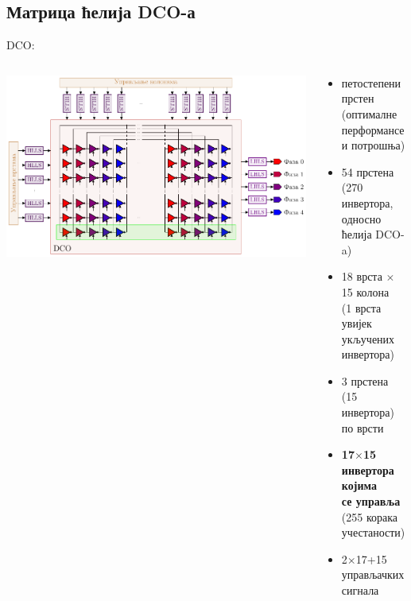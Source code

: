 \documentclass[aspectratio=169]{beamer}
\def \DCO  {DCO} %
\begin{document}
\subsection{Матрица ћелија \DCO-а}

\begin{frame}{\DCO: \subsecname}
	\begin{columns}[t]
        \begin{column}{0.65\linewidth}
		\vspace{-0.5cm}
        	\begin{center}
	            \includegraphics[scale=0.6]{slike/prezentacija/DCO.pdf} 
	        \end{center}
        \end{column}
        \begin{column}{0.35\linewidth}
		\footnotesize
        	\begin{itemize}
	        	\item петостепени прстен\\(оптималне перформансе и потрошња)
	        	\item 54 прстена (270 инвертора,\\односно ћелија \DCO-a)
	        	\item 18 врста $\times$ 15 колона\\(1 \color{green} врста увијек укључених \color {black} \\инвертора)
	        	\item 3 прстена (15 инвертора)\\по врсти
	        	\item \textbf{17$\times$15 инвертора којима \\се управља} \\ (255 корака учестаности)
	        	\item 2$\times$17+15 управљачких сигнала
	        \end{itemize}
        \end{column}
    \end{columns}    
\end{frame}
\end{document}
